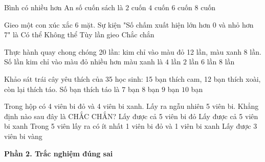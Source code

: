 \begin{ex} %
Bình có nhiều hơn An số cuốn sách là
\choice
{$2$ cuốn}
{\True $4$ cuốn}
{$6$ cuốn}
{$8$ cuốn}
\end{ex}

\begin{ex} %
Gieo một con xúc xắc 6 mặt. Sự kiện "Số chấm xuất hiện lớn hơn 0 và nhỏ hơn 7" là
\choice
{Có thể}
{Không thể}
{Tùy lần gieo}
{\True Chắc chắn}
\end{ex}

\begin{ex} %
Thực hành quay chong chóng 20 lần: kim chỉ vào màu đỏ 12 lần, màu xanh 8 lần. Số lần kim chỉ vào màu đỏ nhiều hơn màu xanh là
\choice
{\True $4$ lần}
{$2$ lần}
{$6$ lần}
{$8$ lần}
\end{ex}

\begin{ex} %
Khảo sát trái cây yêu thích của 35 học sinh: 15 bạn thích cam, 12 bạn thích xoài, còn lại thích táo. Số bạn thích táo là
\choice
{$7$ bạn}
{\True $8$ bạn}
{$9$ bạn}
{$10$ bạn}
\end{ex}

\begin{ex} %
Trong hộp có 4 viên bi đỏ và 4 viên bi xanh. Lấy ra ngẫu nhiên 5 viên bi. Khẳng định nào sau đây là CHẮC CHẮN?
\choice
{Lấy được cả 5 viên bi đỏ}
{Lấy được cả 5 viên bi xanh}
{\True Trong 5 viên lấy ra có ít nhất 1 viên bi đỏ và 1 viên bi xanh}
{Lấy được 3 viên bi vàng}
\end{ex}

\textbf{Phần 2. Trắc nghiệm đúng sai}

